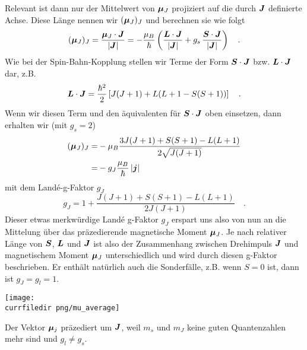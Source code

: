 Relevant ist dann nur der Mittelwert von  $\boldsymbol{\mu}_J $ projiziert auf die durch $\boldsymbol{J}$ definierte Achse.  Diese Länge nennen wir $(\boldsymbol{\mu}_J)_J$ und berechnen sie wie folgt
\begin{equation}
    (\boldsymbol{\mu}_J)_J = \frac{\boldsymbol{\mu}_J \cdot \boldsymbol{J}}{|\boldsymbol{J}|}
    = - \frac{\mu_B}{\hbar} \left(
        \frac{\boldsymbol{L} \cdot \boldsymbol{J}}{|\boldsymbol{J}|}
        +  g_s \,\frac{\boldsymbol{S} \cdot \boldsymbol{J}}{|\boldsymbol{J}|}
    \right)  \quad .
\end{equation}
Wie bei der Spin-Bahn-Kopplung stellen wir Terme der Form $\boldsymbol{S} \cdot \boldsymbol{J}$ bzw. $\boldsymbol{L} \cdot \boldsymbol{J}$  dar, z.B.
\begin{equation}
    \boldsymbol{L} \cdot \boldsymbol{J} = \frac{\hbar^2}{2}
    \left[
  J (J+1) + L(L+1 - S(S+1))
    \right]  \quad .
\end{equation}
Wenn wir diesen Term und den äquivalenten für  $\boldsymbol{S} \cdot \boldsymbol{J}$  oben einsetzen, dann erhalten wir (mit $g_s = 2$)
\begin{align}
    (\boldsymbol{\mu}_J)_J = & - \mu_B \frac{3 J (J+1)+ S(S+1) - L(L+1)}{2 \sqrt{J (J+1)}} \\
    = & - g_J \frac{\mu_B}{\hbar} \, |\boldsymbol{j}|
\end{align}
mit dem Landé-g-Faktor $g_J$ 
\begin{equation}
    g_J = 1 + \frac{J (J+1)+ S(S+1) - L(L+1)}{2 J (J+1)}   \quad .
\end{equation}
Dieser etwas merkwürdige Landé g-Faktor $g_J$ erspart uns also von nun an die Mittelung über das präzedierende magnetische Moment $\boldsymbol{\mu}_J$. Je nach relativer Länge von $\boldsymbol{S}$, $\boldsymbol{L}$ und $\boldsymbol{J}$ ist also der Zusammenhang zwischen Drehimpuls $\boldsymbol{J}$ und magnetischem Moment $\boldsymbol{\mu}_J$ unterschiedlich und wird durch diesen g-Faktor beschrieben. Er enthält natürlich auch die Sonderfälle, z.B. wenn $S=0$ ist, dann ist $g_J = g_l = 1$.


\begin{marginfigure}
        \texttt{[image: \\currfiledir png/mu\_average]}
    \caption{Der Vektor $\boldsymbol{\mu}_j$ präzediert um $\boldsymbol{J}$, weil $m_s$ und $m_J$ keine guten Quantenzahlen mehr sind und $g_l \neq g_s$. }
\end{marginfigure}


